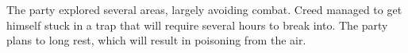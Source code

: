 The party explored several areas, largely avoiding combat.
Creed managed to get himself stuck in a trap that will require several hours to break into.
The party plans to long rest, which will result in poisoning from the air.
